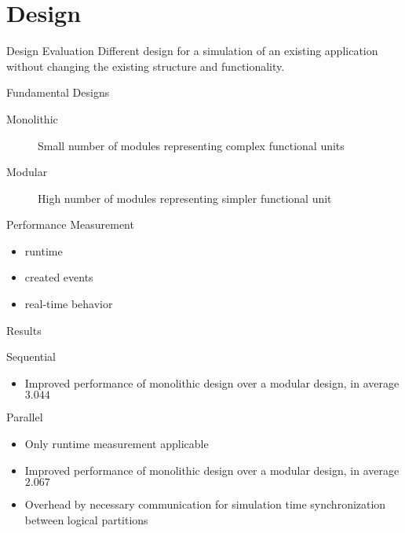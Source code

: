 \section{Design}
\begin{frame}{Design Evaluation}
    Different design for a simulation of an existing application without changing the existing structure and functionality.
    
    \begin{block}{Fundamental Designs}
        \begin{description}
            \item[Monolithic] Small number of modules representing complex functional units 
            \item[Modular] High number of modules representing simpler functional unit
        \end{description}
    \end{block}
    
    \begin{block}{Performance Measurement}
        \begin{itemize}
            \item runtime
            \item created events
            \item real-time behavior
        \end{itemize}
    \end{block}
\end{frame}

\begin{frame}{Results}
    
    
    \begin{block}{Sequential}
        \begin{itemize}
            \item Improved performance of monolithic design over a modular design, in average $3.044$
        \end{itemize}
    \end{block}
    
    \begin{block}{Parallel}
        \begin{itemize}
            \item Only runtime measurement applicable
            \item Improved performance of monolithic design over a modular design, in average $2.067$
            \item Overhead by necessary communication for simulation time synchronization between logical partitions
        \end{itemize}
    \end{block}    
\end{frame}